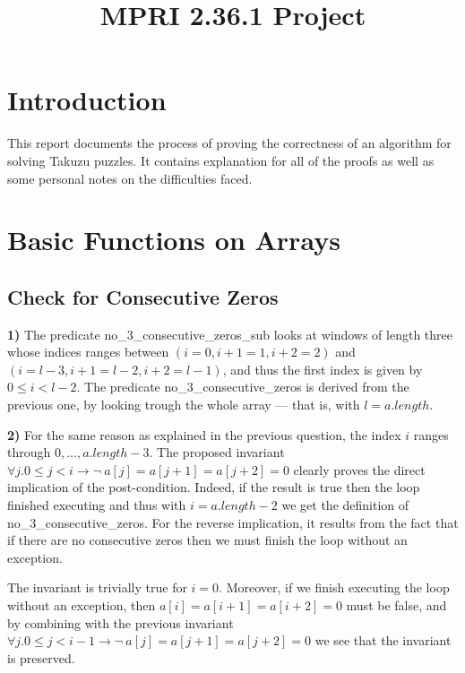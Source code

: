 \documentclass[]{StandardTemplate}
\title{MPRI 2.36.1 Project}
\begin{document}
\maketitle

\section{Introduction}
\label{sec:intro}



This report documents the process of proving the correctness of an algorithm for solving Takuzu puzzles. It contains explanation for all of the proofs as well as some personal notes on the difficulties faced.

\section{Basic Functions on Arrays}
\label{sec:arrays}

\subsection{Check for Consecutive Zeros}
\label{subsec:zeros}

\textbf{1)} The predicate no\_3\_consecutive\_zeros\_sub looks at windows of length three whose indices ranges between $ (i=0,i+1=1,i+2=2) $ and $ (i=l-3,i+1=l-2,i+2=l-1) $, and thus the first index is given by $ 0 \leq i < l-2 $. The predicate no\_3\_consecutive\_zeros is derived from the previous one, by looking trough the whole array --- that is, with $ l = a.length $.

\textbf{2)} For the same reason as explained in the previous question, the index $ i $ ranges through $ 0,...,a.length-3 $. The proposed invariant $ \forall j. 0 \leq j < i \to \neg~ a[j]=a[j+1]=a[j+2]=0 $ clearly proves the direct implication of the post-condition. Indeed, if the result is true then the loop finished executing and thus with $ i = a.length - 2 $ we get the definition of no\_3\_consecutive\_zeros. For the reverse implication, it results from the fact that if there are no consecutive zeros then we must finish the loop without an exception. 

The invariant is trivially true for $ i=0 $. Moreover, if we finish executing the loop without an exception, then $a[i]=a[i+1]=a[i+2]=0$ must be false, and by combining with the previous invariant $ \forall j. 0 \leq j < i-1 \to \neg~ a[j]=a[j+1]=a[j+2]=0 $ we see that the invariant is preserved.
\end{document}
